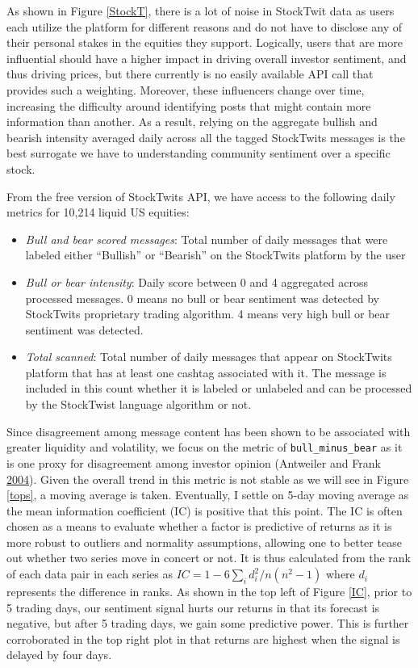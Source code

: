 \documentclass[11,]{article}
\providecommand{\tightlist}{%
  \setlength{\itemsep}{0pt}\setlength{\parskip}{0pt}}
\begin{document}
As shown in Figure \ref{StockT}, there is a lot of noise in StockTwit
data as users each utilize the platform for different reasons and do not
have to disclose any of their personal stakes in the equities they
support. Logically, users that are more influential should have a higher
impact in driving overall investor sentiment, and thus driving prices,
but there currently is no easily available API call that provides such a
weighting. Moreover, these influencers change over time, increasing the
difficulty around identifying posts that might contain more information
than another. As a result, relying on the aggregate bullish and bearish
intensity averaged daily across all the tagged StockTwits messages is
the best surrogate we have to understanding community sentiment over a
specific stock.

From the free version of StockTwits API, we have access to the following
daily metrics for 10,214 liquid US equities:

\begin{itemize}
\tightlist
\item
  \emph{Bull and bear scored messages}: Total number of daily messages
  that were labeled either ``Bullish'' or ``Bearish'' on the StockTwits
  platform by the user
\item
  \emph{Bull or bear intensity}: Daily score between 0 and 4 aggregated
  across processed messages. 0 means no bull or bear sentiment was
  detected by StockTwits proprietary trading algorithm. 4 means very
  high bull or bear sentiment was detected.
\item
  \emph{Total scanned}: Total number of daily messages that appear on
  StockTwits platform that has at least one cashtag associated with it.
  The message is included in this count whether it is labeled or
  unlabeled and can be processed by the StockTwist language algorithm or
  not.
\end{itemize}

Since disagreement among message content has been shown to be associated
with greater liquidity and volatility, we focus on the metric of
\texttt{bull\_minus\_bear} as it is one proxy for disagreement among
investor opinion (Antweiler and Frank
\protect\hyperlink{ref-antweiler2004}{2004}). Given the overall trend in
this metric is not stable as we will see in Figure \ref{tops}, a moving
average is taken. Eventually, I settle on 5-day moving average as the
mean information coefficient (IC) is positive that this point. The IC is
often chosen as a means to evaluate whether a factor is predictive of
returns as it is more robust to outliers and normality assumptions,
allowing one to better tease out whether two series move in concert or
not. It is thus calculated from the rank of each data pair in each
series as \(IC = 1- 6\sum_i d_i^2 / n(n^2-1)\) where \(d_i\) represents
the difference in ranks. As shown in the top left of Figure \ref{IC},
prior to 5 trading days, our sentiment signal hurts our returns in that
its forecast is negative, but after 5 trading days, we gain some
predictive power. This is further corroborated in the top right plot in
that returns are highest when the signal is delayed by four days.
\end{document}
